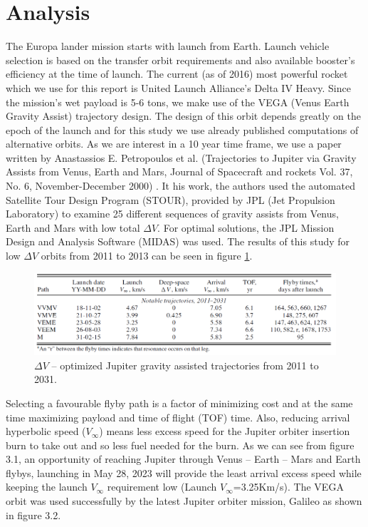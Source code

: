 \section{Analysis}
The Europa lander mission starts with launch from Earth. Launch vehicle selection is based on the transfer orbit requirements and also available booster’s efficiency at the time of launch. The current (as of 2016) most powerful rocket which we use for this report is United Launch Alliance’s Delta IV Heavy. Since the mission’s wet payload is 5-6 tons, we make use of the VEGA (Venus Earth Gravity Assist) 
trajectory design. The design of this orbit depends greatly on the epoch of the launch and for this study we use already published computations of alternative orbits. As we are interest in a 10 year time frame, we use a paper written by Anastassios E. Petropoulos et al. (Trajectories to Jupiter via Gravity Assists from Venus, Earth and Mars, Journal of Spacecraft and rockets Vol. 37, No. 6, November-December 2000)
. It his work, the authors used the automated Satellite Tour Design Program (STOUR), provided by JPL (Jet Propulsion Laboratory) to examine 25 different sequences of gravity assists from Venus, Earth and Mars with low total $\Delta V$. For optimal solutions, the JPL Mission Design and Analysis Software (MIDAS) was used. The results of this study for low $\Delta V$ orbits from 2011 to 2013 can be seen in figure \ref{fig:grav_ass_traj}.

\begin{figure}[htb!]
\centering
\includegraphics[width=1\textwidth]{figures/Orbiter/traj.png}
\caption{$\Delta V$ – optimized Jupiter gravity assisted trajectories from 2011 to 2031. \cite{petropoulos2000a}}\label{fig:grav_ass_traj}
\end{figure}

Selecting a favourable flyby path is a factor of minimizing cost and at the same time maximizing payload and time of flight (TOF) time. Also, reducing arrival hyperbolic speed ($V_{\infty}$) means less excess speed for the Jupiter orbiter insertion burn to take out and so less fuel needed for the burn. As we can see from figure 3.1, an opportunity of reaching Jupiter through Venus – Earth – Mars and Earth flybys, launching in May 28, 2023 will provide the least arrival excess speed while keeping the launch $V_{\infty}$ requirement low (Launch $V_{\infty}$=3.25Km/s). The VEGA orbit was used successfully by the latest Jupiter orbiter mission, Galileo as shown in figure 3.2.

